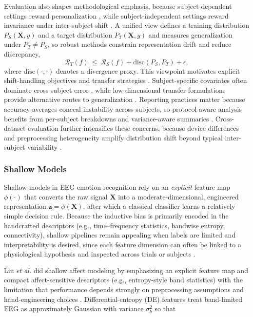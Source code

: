 \documentclass{WileyMSP-template}
\begin{document}
Evaluation also shapes methodological emphasis, because subject-dependent settings reward personalization \cite{smalar2019emotions}, while subject-independent settings reward invariance under inter-subject shift \cite{vgupta2019crosssub}. A unified view defines a training distribution $P_S(\mathbf{X},y)$ and a target distribution $P_T(\mathbf{X},y)$ and measures generalization under $P_T\neq P_S$, so robust methods constrain representation drift and reduce discrepancy,
\begin{equation}
\mathcal{R}_T(f)\ \le\ \mathcal{R}_S(f)+\mathrm{disc}\!\left(P_S,P_T\right)+\epsilon,
\end{equation}
where $\mathrm{disc}(\cdot,\cdot)$ denotes a divergence proxy. This viewpoint motivates explicit shift-handling objectives and transfer strategies \cite{dwuyxu2020transfer}. Subject-specific covariates often dominate cross-subject error \cite{xjiang2019transfer}, while low-dimensional transfer formulations provide alternative routes to generalization \cite{pyjeng2021lowdimen}. Reporting practices matter because accuracy averages conceal instability across subjects, so protocol-aware analysis benefits from per-subject breakdowns and variance-aware summaries \cite{nssuha2020eegbased}. Cross-dataset evaluation further intensifies these concerns, because device differences and preprocessing heterogeneity amplify distribution shift beyond typical inter-subject variability \cite{lyanrz2018tradaboo}.

\subsubsection{Shallow Models}

Shallow models in EEG emotion recognition rely on an \emph{explicit} feature map $\phi(\cdot)$ that converts the raw signal $\mathbf{X}$ into a moderate-dimensional, engineered representation $\mathbf{z}=\phi(\mathbf{X})$, after which a classical classifier learns a relatively simple decision rule. Because the inductive bias is primarily encoded in the handcrafted descriptors (e.g., time--frequency statistics, bandwise entropy, connectivity), shallow pipelines remain appealing when labels are limited and interpretability is desired, since each feature dimension can often be linked to a physiological hypothesis and inspected across trials or subjects \cite{ztliuq2019electroe,plieta2019eegbased,sphadi2019asurveyo,thzhou2020waveletb}.

Liu \textit{et al.} did shallow affect modeling by emphasizing an explicit feature map and compact affect-sensitive descriptors (e.g., entropy-style band statistics) with the limitation that performance depends strongly on preprocessing assumptions and hand-engineering choices \cite{ztliuq2019electroe}. Differential-entropy (DE) features treat band-limited EEG as approximately Gaussian with variance $\sigma_b^2$ so that
\end{document}
